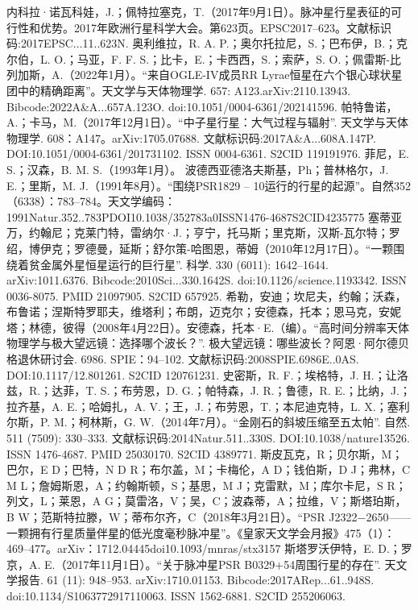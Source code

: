 内科拉·诺瓦科娃，J.；佩特拉塞克，T.（2017年9月1日）。脉冲星行星表征的可行性和优势。2017年欧洲行星科学大会。第623页。EPSC2017–623。文献标识码:2017EPSC...11..623N.
奥利维拉，R. A. P.；奥尔托拉尼，S.；巴布伊，B.；克尔伯，L. O.；马亚，F. F. S.；比卡，E.；卡西西，S.；索萨，S. O.；佩雷斯-比列加斯，A.（2022年1月）。“来自OGLE-IV成员RR Lyrae恒星在六个银心球状星团中的精确距离”。天文学与天体物理学. 657: A123.arXiv:2110.13943. Bibcode:2022A&A...657A.123O. doi:10.1051/0004-6361/202141596.
帕特鲁诺，A.；卡马，M.（2017年12月1日）。“中子星行星：大气过程与辐射”. 天文学与天体物理学. 608：A147。arXiv:1705.07688. 文献标识码:2017A&A...608A.147P. DOI:10.1051/0004-6361/201731102. ISSN 0004-6361. S2CID 119191976.
菲尼，E. S.；汉森，B. M. S.（1993年1月）。
波德西亚德洛夫斯基，Ph；普林格尔，J. E.；里斯，M. J.（1991年8月）。“围绕PSR1829 – 10运行的行星的起源”。自然352（6338）：783–784。天文学编码：1991Natur.352..783PDOI10.1038/352783a0ISSN1476-4687S2CID4235775
塞蒂亚万，约翰尼；克莱门特，雷纳尔·J.；亨宁，托马斯；里克斯，汉斯-瓦尔特；罗绍，博伊克；罗德曼，延斯；舒尔策-哈图恩，蒂姆（2010年12月17日）。“一颗围绕着贫金属外星恒星运行的巨行星”. 科学. 330 (6011): 1642–1644. arXiv:1011.6376. Bibcode:2010Sci...330.1642S. doi:10.1126/science.1193342. ISSN 0036-8075. PMID 21097905. S2CID 657925.
希勒，安迪；坎尼夫，约翰；沃森，布鲁诺；涅斯特罗耶夫，维塔利；布朗，迈克尔；安德森，托本；恩马克，安妮塔；林德，彼得（2008年4月22日）。安德森，托本·E.（编）。“高时间分辨率天体物理学与极大望远镜：选择哪个波长？”. 极大望远镜：哪些波长？阿恩·阿尔德贝格退休研讨会. 6986. SPIE：94–102. 文献标识码:2008SPIE.6986E..0AS. DOI:10.1117/12.801261. S2CID 120761231.
史密斯，R. F.；埃格特，J. H.；让洛兹，R.；达菲，T. S.；布劳恩，D. G.；帕特森，J. R.；鲁德，R. E.；比纳，J.；拉齐基，A. E.；哈姆扎，A. V.；王，J.；布劳恩，T.；本尼迪克特，L. X.；塞利尔斯，P. M.；柯林斯，G. W.（2014年7月）。“金刚石的斜坡压缩至五太帕”. 自然. 511 (7509): 330–333. 文献标识码:2014Natur.511..330S. DOI:10.1038/nature13526. ISSN 1476-4687. PMID 25030170. S2CID 4389771.
斯皮瓦克，R；贝尔斯，M；巴尔，E D；巴特，N D R；布尔盖，M；卡梅伦，A D；钱伯斯，D J；弗林，C M L；詹姆斯恩，A；约翰斯顿，S；基思，M J；克雷默，M；库尔卡尼，S R；列文，L；莱恩，A G；莫雷洛，V；吴，C；波森蒂，A；拉维，V；斯塔珀斯，B W；范斯特拉滕，W；蒂布尔齐，C（2018年3月21日）。“PSR J2322−2650——一颗拥有行星质量伴星的低光度毫秒脉冲星”。《皇家天文学会月报》475（1）：469–477。arXiv：1712.04445doi10.1093/mnras/stx3157
斯塔罗沃伊特，E. D.；罗京，A. E.（2017年11月1日）。“关于脉冲星PSR B0329+54周围行星的存在”. 天文学报告. 61 (11): 948–953. arXiv:1710.01153. Bibcode:2017ARep...61..948S. doi:10.1134/S1063772917110063. ISSN 1562-6881. S2CID 255206063.
